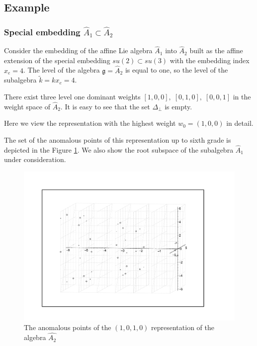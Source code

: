 \documentclass[a4paper,12pt]{article}
\theoremstyle{definition} \newtheorem{Def}{Definition}
\begin{document}
\subsection{Example}
\label{sec:example}

\subsubsection{Special embedding $\hat{A}_1\subset\hat{A}_2$}
\label{sec:spec-embedd-hata_1s}
Consider the embedding of the affine Lie algebra $\hat{A}_1$ into $\hat{A}_2$ built as the affine extension of the special embedding $su(2)\subset su(3)$ with the embedding index $x_e=4$. The level of the algebra $\mathfrak{g}=\hat{A}_2$ is equal to one, so the level of the subalgebra $\tilde{k}=kx_e=4$.

There exist three level one dominant weights $[1,0,0],\;[0,1,0],\;[0,0,1]$ in the weight space of $\hat{A}_2$.
It is easy to see that the set $\Delta_{\bot}$ is empty.

Here we view the representation with the highest weight
$w_0=(1,0,0)$ in detail.

The set of the anomalous points of this representation up to sixth grade is depicted in the Figure \ref{fig:affine_A2_anom_point}. We also show the root subspace of the subalgebra $\hat{A}_1$ under consideration.

\begin{figure}[h!tb]
  \includegraphics[width=160mm]{AffineA2_A1_anom.pdf}
  \caption{The anomalous points of the $(1,0,1,0)$ representation of the algebra $\hat{A_2}$}
  \label{fig:affine_A2_anom_point}
\end{figure}
\end{document}
